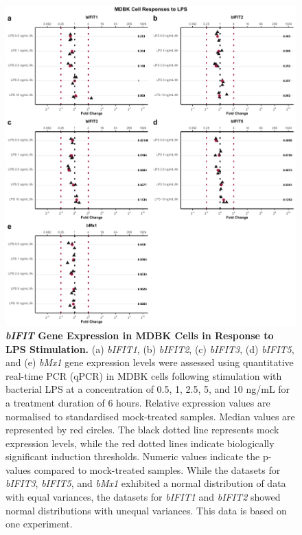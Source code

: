 \begin{figure}
    \centering
    \includegraphics[width=1\linewidth]{07. Chapter 2/Figs/02. Induction/02. mdbk_treat_lps.pdf}
    \caption[\textit{bIFIT} Gene Expression in MDBK Cells in Response to LPS Stimulation.]{\textbf{\textit{bIFIT} Gene Expression in MDBK Cells in Response to LPS Stimulation.} (a) \textit{bIFIT1}, (b) \textit{bIFIT2}, (c) \textit{bIFIT3}, (d) \textit{bIFIT5}, and (e) \textit{bMx1} gene expression levels were assessed using quantitative real-time PCR (qPCR) in MDBK cells following stimulation with bacterial LPS at a concentration of 0.5, 1, 2.5, 5, and 10 ng/mL for a treatment duration of 6 hours. Relative expression values are normalised to standardised mock-treated samples. Median values are represented by red circles. The black dotted line represents mock expression levels, while the red dotted lines indicate biologically significant induction thresholds. Numeric values indicate the p-values compared to mock-treated samples. While the datasets for \textit{bIFIT3}, \textit{bIFIT5}, and \textit{bMx1} exhibited a normal distribution of data with equal variances, the datasets for \textit{bIFIT1} and \textit{bIFIT2} showed normal distributions with unequal variances. This data is based on one experiment.}
    \label{fig:MDBK responses to LPS}
\end{figure}

